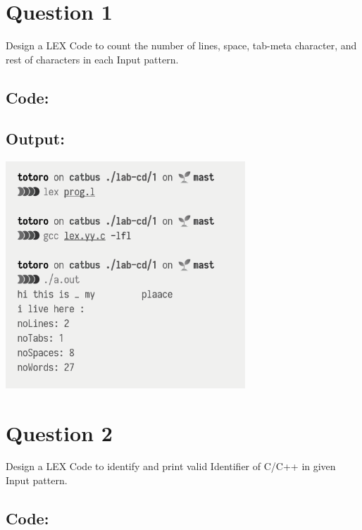 \documentclass{article}
\begin{document}
\newpage
\section*{Question 1}
Design a LEX Code to count the number of lines, space,
tab-meta character, and rest of characters in each Input
pattern.
\subsection*{Code:}

\newpage
\subsection*{Output:}
% 
\begin{center}
  \includegraphics[width=9cm]{1/out.png}
\end{center}

\newpage
\section*{Question 2}
Design a LEX Code to identify and print valid Identifier of
C/C++ in given Input pattern.
\subsection*{Code:}

\newpage
\end{document}
